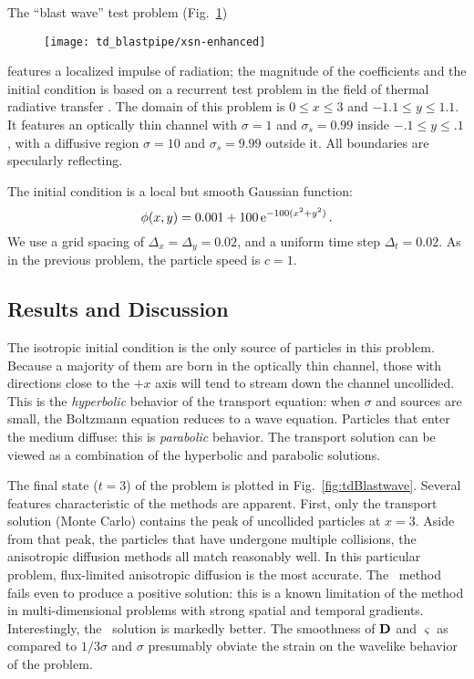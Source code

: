 The ``blast wave'' test problem (Fig.~\ref{fig:tdBlastwaveXsn})
%
\begin{figure}[htb]
  \centering
  \hspace{-.5in}
  \texttt{[image: td\_blastpipe/xsn-enhanced]}
  \label{fig:tdBlastwaveXsn}
\end{figure}
%
features a localized impulse of radiation; the
magnitude of the coefficients and the initial condition is based on a recurrent
test problem in the field
of thermal radiative transfer \cite{Kno1999a,Kno2001,Rau2005,Ols2007}. The
domain of this problem is $0 \le x \le 3$ and $-1.1 \le y \le 1.1$.
It features an optically thin channel with $\sigma=1$ and $\sigma_s=0.99$ inside
$-.1 \le y \le .1$, with a diffusive region $\sigma=10$ and $\sigma_s=9.99$
outside it. All boundaries are specularly reflecting.

The initial condition is a local but smooth Gaussian function:
\begin{equation*}
  \phi(x,y) = 0.001 + 100 \mathop{}\!\mathrm{e}^{-100 (x^2 + y^2) }\,.
\end{equation*}
We use a grid spacing of $\Delta_x=\Delta_y=0.02$, and a uniform time step
$\Delta_t=0.02$. As in the previous problem, the particle speed is $c=1$.

\subsection{Results and Discussion}

The isotropic initial condition is the only source of particles in this
problem. Because a majority of them are born in the optically thin channel,
those with directions close to the $+x$ axis will tend to stream down the
channel uncollided. This is the \emph{hyperbolic} behavior of the transport
equation: when $\sigma$ and sources are small, the Boltzmann equation reduces
to a wave equation.
Particles that enter the medium diffuse: this is \emph{parabolic} behavior. The
transport solution can be viewed as a combination of the hyperbolic and
parabolic solutions.

The final state ($t=3$) of the problem is plotted in Fig.~\ref{fig:tdBlastwave}.
Several features characteristic of the methods are apparent. First, only the
transport solution (Monte Carlo) contains the peak of uncollided particles at
$x=3$. Aside from that peak, the particles that have undergone
multiple collisions, the anisotropic diffusion methods all match reasonably
well. In this particular problem, flux-limited anisotropic diffusion is the most
accurate. The \Pone\ method fails even to produce a positive solution: this is a
known limitation of the method in multi-dimensional problems with strong spatial
and temporal gradients. Interestingly, the \APone\ solution is markedly better.
The smoothness of $\mathbf{D}$ and $\varsigma$ as compared to $1/3\sigma$ and
$\sigma$ presumably obviate the strain on the wavelike behavior of the problem.

